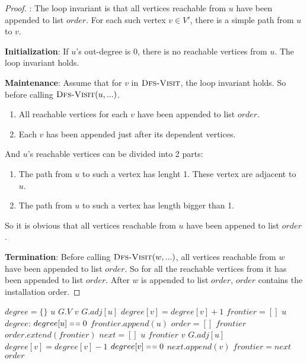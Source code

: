 \documentclass[12pt,twoside]{article}
\begin{document}
\begin{proof}: The loop invariant is that all vertices reachable from $u$ have
  been appended to list $order$. For each such vertex $v \in V'$, there is a
  simple path from $u$ to $v$.

\textbf{Initialization}: If $u$'s out-degree is 0, there is no reachable
vertices from $u$.  The loop invariant holds.

\textbf{Maintenance}: Assume that for $v$ in $\textnormal{\scshape Dfs-Visit}$, the loop
invariant holds. So before calling $\textnormal{\scshape Dfs-Visit}(u, ...)$.
\begin{enumerate}
\item All reachable vertices for each $v$ have been appended to list $order$.
\item Each $v$ has been appended just after its dependent vertices.
\end{enumerate}

And $u$'s reachable vertices can be divided into 2 parts:

\begin{enumerate}
\item The path from $u$ to such a vertex has lenght 1. These vertex are adjacent
  to $u$.
\item The path from $u$ to such a vertex has length bigger than 1.
\end{enumerate}

So it is obvious that all vertices reachable from $u$ have been appened to list
$order$.

\textbf{Termination}: Before calling $\textnormal{\scshape Dfs-Visit}(w, ...)$, all vertices
reachable from $w$ have been appended to list $order$. So for all the reachable
vertices from it has been appended to list $order$. After $w$ is appended to
list $order$, $order$ contains the installation order.

\end{proof}
\begin{codebox}
\li $degree = \{\}$
\li \For $u$ \In $G.V$
\li \Do \For $v$ \In $G.adj[u]$
\li \Do $degree[v] = degree[v] + 1$
\End \End
\li $frontier = []$
\li \For $u$ \In $degree$:
\li \Do \If $degree[u] \isequal 0$
\li \Then $frontier.append(u)$
\End \End
\li $order = []$
\li \While $frontier$
\li \Do $order.extend(frontier)$
\li $next = []$
\li \For $u$ \In $frontier$
\li \Do \For $v$ \In $G.adj[u]$
\li \Do $degree[v] = degree[v] - 1$
\li \If $degree[v] \isequal 0$
\li \Then $next.append(v)$
\End \End \End
\li $frontier = next$
\End \End \End
\End
\li \Return $order$
\end{codebox}
\end{document}
